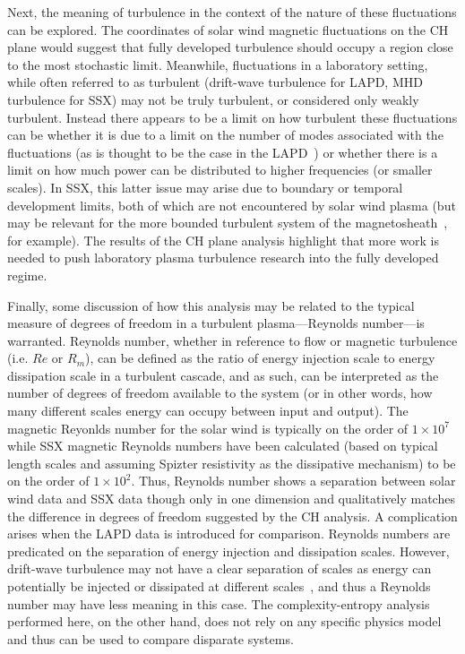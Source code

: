 \documentclass[aps,prx,twocolumn,secnumarabic,nobalancelastpage,amsmath,amssymb,
nofootinbib]{revtex4-1}
\begin{document}
Next, the meaning of turbulence in the context of the nature of these fluctuations can be explored. The coordinates of solar wind magnetic fluctuations on the CH plane would suggest that fully developed turbulence should occupy a region close to the most stochastic limit. Meanwhile, fluctuations in a laboratory setting, while often referred to as turbulent (drift-wave turbulence for LAPD, MHD turbulence for SSX) may not be truly turbulent, or considered only weakly turbulent. Instead there appears to be a limit on how turbulent these fluctuations can be whether it is due to a limit on the number of modes associated with the fluctuations (as is thought to be the case in the LAPD~\cite{maggs2013}) or whether there is a limit on how much power can be distributed to higher frequencies (or smaller scales). In SSX, this latter issue may arise due to boundary or temporal development limits, both of which are not encountered by solar wind plasma (but may be relevant for the more bounded turbulent system of the magnetosheath~\cite{SahraouiPRL2006,YordanovaPRL2008}, for example). The results of the CH plane analysis highlight that more work is needed to push laboratory plasma turbulence research into the fully developed regime.
 
Finally, some discussion of how this analysis may be related to the typical measure of degrees of freedom in a turbulent plasma---Reynolds number---is warranted. Reynolds number, whether in reference to flow or magnetic turbulence (i.e. $Re$ or $R_{m}$), can be defined as the ratio of energy injection scale to energy dissipation scale in a turbulent cascade, and as such, can be interpreted as the number of degrees of freedom available to the system (or in other words, how many different scales energy can occupy between input and output). The magnetic Reyonlds number for the solar wind is typically on the order of $1 \times 10^7$ while SSX magnetic Reynolds numbers have been calculated (based on typical length scales and assuming Spizter resistivity as the dissipative mechanism) to be on the order of $1 \times 10^2$. Thus, Reynolds number shows a separation between solar wind data and SSX data though only in one dimension and qualitatively matches the difference in degrees of freedom suggested by the CH analysis. A complication arises when the LAPD data is introduced for comparison. Reynolds numbers are predicated on the separation of energy injection and dissipation scales. However, drift-wave turbulence may not have a clear separation of scales as energy can potentially be injected or dissipated at different scales~\cite{friedman2012}, and thus a Reynolds number may have less meaning in this case. The complexity-entropy analysis performed here, on the other hand, does not rely on any specific physics model and thus can be used to compare disparate systems.
\end{document}
